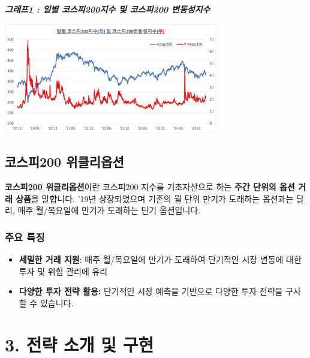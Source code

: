 \documentclass[
  a4paper,
  DIV=11,
  numbers=noendperiod]{scrreprt}
\providecommand{\tightlist}{%
  \setlength{\itemsep}{0pt}\setlength{\parskip}{0pt}}\usepackage{longtable,booktabs,array}
\begin{document}
\textbf{\emph{그래프1 : 일별 코스피200지수 및 코스피200 변동성지수}}

\begin{center}
\includegraphics[width=0.7\textwidth,height=\textheight]{image/vkospi.png}
\end{center}

\subsection*{코스피200
위클리옵션}\label{uxcf54uxc2a4uxd53c200-uxc704uxd074uxb9acuxc635uxc158}

\textbf{코스피200 위클리옵션}이란 코스피200 지수를 기초자산으로 하는
\textbf{주간 단위의 옵션 거래 상품}을 말합니다. '19년 상장되었으며
기존의 월 단위 만기가 도래하는 옵션과는 달리, 매주 월/목요일에 만기가
도래하는 단기 옵션입니다.

\subsubsection*{주요 특징}\label{uxc8fcuxc694-uxd2b9uxc9d5-1}

\begin{itemize}
\tightlist
\item
  \textbf{세밀한 거래 지원}: 매주 월/목요일에 만기가 도래하여 단기적인
  시장 변동에 대한 투자 및 위험 관리에 유리
\item
  \textbf{다양한 투자 전략 활용:} 단기적인 시장 예측을 기반으로 다양한
  투자 전략을 구사할 수 있습니다.
\end{itemize}

\section*{3. 전략 소개 및
구현}\label{uxc804uxb7b5-uxc18cuxac1c-uxbc0f-uxad6cuxd604}

\end{document}
